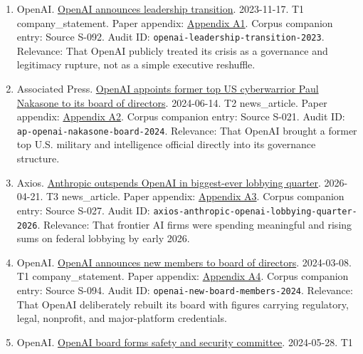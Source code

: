 \documentclass[
  american,
  11pt,
  letterpaper,
]{article}
\providecommand{\tightlist}{%
  \setlength{\itemsep}{0pt}\setlength{\parskip}{0pt}}
\begin{document}
\begin{enumerate}
\def\labelenumi{\arabic{enumi}.}
\tightlist
\item
  OpenAI.
  \href{https://openai.com/index/openai-announces-leadership-transition/}{OpenAI
  announces leadership transition}. 2023-11-17. T1 company\_statement.
  Paper appendix:
  \hyperref[ch-08-appendix-a1-openai-announces-leadership-transition]{Appendix
  A1}. Corpus companion entry: Source S-092. Audit ID:
  \texttt{openai-leadership-transition-2023}. Relevance: That OpenAI
  publicly treated its crisis as a governance and legitimacy rupture,
  not as a simple executive reshuffle.
\item
  Associated Press.
  \href{https://apnews.com/article/6ef612a3a0fcaef05480bbd1ebbd79b1}{OpenAI
  appoints former top US cyberwarrior Paul Nakasone to its board of
  directors}. 2024-06-14. T2 news\_article. Paper appendix:
  \hyperref[ch-08-appendix-a2-openai-appoints-former-top-us-cyberwarrior-paul-nakasone-to-its-board-of-directors]{Appendix
  A2}. Corpus companion entry: Source S-021. Audit ID:
  \texttt{ap-openai-nakasone-board-2024}. Relevance: That OpenAI brought
  a former top U.S. military and intelligence official directly into its
  governance structure.
\item
  Axios.
  \href{https://www.axios.com/2026/04/21/anthropic-outspends-openai-biggest-lobbying-quarter}{Anthropic
  outspends OpenAI in biggest-ever lobbying quarter}. 2026-04-21. T3
  news\_article. Paper appendix:
  \hyperref[ch-08-appendix-a3-anthropic-outspends-openai-in-biggest-ever-lobbying-quarter]{Appendix
  A3}. Corpus companion entry: Source S-027. Audit ID:
  \texttt{axios-anthropic-openai-lobbying-quarter-2026}. Relevance: That
  frontier AI firms were spending meaningful and rising sums on federal
  lobbying by early 2026.
\item
  OpenAI.
  \href{https://openai.com/index/openai-announces-new-members-to-board-of-directors/}{OpenAI
  announces new members to board of directors}. 2024-03-08. T1
  company\_statement. Paper appendix:
  \hyperref[ch-08-appendix-a4-openai-announces-new-members-to-board-of-directors]{Appendix
  A4}. Corpus companion entry: Source S-094. Audit ID:
  \texttt{openai-new-board-members-2024}. Relevance: That OpenAI
  deliberately rebuilt its board with figures carrying regulatory,
  legal, nonprofit, and major-platform credentials.
\item
  OpenAI.
  \href{https://openai.com/index/openai-board-forms-safety-and-security-committee/}{OpenAI
  board forms safety and security committee}. 2024-05-28. T1

\end{enumerate}
\end{document}
